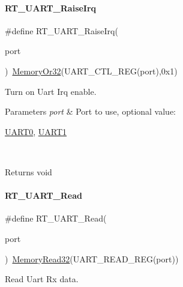 \paragraph{\texorpdfstring{R\+T\+\_\+\+U\+A\+R\+T\+\_\+\+Raise\+Irq}{RT\_UART\_RaiseIrq}}
{\footnotesize\ttfamily \#define R\+T\+\_\+\+U\+A\+R\+T\+\_\+\+Raise\+Irq(\begin{DoxyParamCaption}\item[{}]{port }\end{DoxyParamCaption})~\mbox{\hyperlink{a00068_a27874a97deab7cecdde5ddecf466e31e}{Memory\+Or32}}(U\+A\+R\+T\+\_\+\+C\+T\+L\+\_\+\+R\+EG(port),0x1)}



Turn on Uart Irq enable. 


\begin{DoxyParams}{Parameters}
{\em port} & Port to use, optional value\+:
\begin{DoxyCode}
\mbox{\hyperlink{a00173_a0508661f121639ffdee7de2353a0def2}{UART0}}, \mbox{\hyperlink{a00173_a8d69bf04d07af4fbbab5a8bd291f65ff}{UART1}}
\end{DoxyCode}
 \\
\hline
\end{DoxyParams}
\begin{DoxyReturn}{Returns}
void 
\end{DoxyReturn}
\mbox{\label{a00173_a7804645fb092b24545278660f6b66409}} 
\paragraph{\texorpdfstring{R\+T\+\_\+\+U\+A\+R\+T\+\_\+\+Read}{RT\_UART\_Read}}
{\footnotesize\ttfamily \#define R\+T\+\_\+\+U\+A\+R\+T\+\_\+\+Read(\begin{DoxyParamCaption}\item[{}]{port }\end{DoxyParamCaption})~\mbox{\hyperlink{a00068_a2d484dc15bdf30ee11ab3b05f31f0e16}{Memory\+Read32}}(U\+A\+R\+T\+\_\+\+R\+E\+A\+D\+\_\+\+R\+EG(port))}



Read Uart Rx data. 


